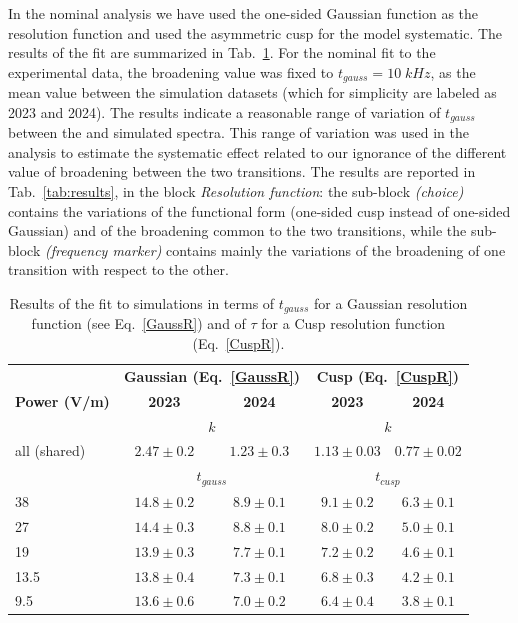 In the nominal analysis we have used the one-sided Gaussian function as the resolution function and used the asymmetric
cusp for the model systematic. The results of the fit are summarized in Tab.~\ref{tab:resfun}. For the nominal fit to the experimental data, the broadening value was fixed to $t_{gauss} = 10 \; kHz$, as the mean value between the simulation datasets (which for simplicity are labeled as 2023 and 2024). The results indicate a reasonable range of variation of $t_{gauss}$ between the \cb and \da simulated spectra. This range of variation was used in the analysis to estimate the systematic effect related to our ignorance of the different value of broadening between the two transitions. The results are reported in Tab.~\ref{tab:results}, in the block \textit{Resolution function}: the sub-block \textit{(choice)} contains the variations of the functional form (one-sided cusp instead of one-sided Gaussian) and of the broadening common to the two transitions, while the sub-block \textit{(frequency marker)} contains mainly the variations of the broadening of one transition with respect to the other.

\begin{table}[!h]
    \centering
    \begin{tabular}{l|cc|cc}
\hline\hline
 & \multicolumn{2}{c|}{\bf Gaussian (Eq.~\ref{GaussR})} & \multicolumn{2}{c}{\bf Cusp (Eq.~\ref{CuspR})} \\ 
{\bf   Power (V/m)}  & {\bf 2023} & {\bf 2024} & {\bf 2023} & {\bf 2024}  \\
 \hline
   & \multicolumn{2}{c|}{$k$} & \multicolumn{2}{c}{$k$} \\ 
all (shared)    &  $2.47 \pm 0.2$ & $1.23 \pm 0.3$ & $1.13 \pm 0.03 $ & $0.77 \pm 0.02 $ \\
\hline  
    & \multicolumn{2}{c|}{$t_{gauss}$} & \multicolumn{2}{c}{$t_{cusp}$} \\ 
38	  & $14.8 \pm 0.2 $ & $8.9 \pm 0.1 $ & $9.1 \pm 0.2 $ & $6.3 \pm 0.1 $ \\
27	  & $14.4 \pm 0.3 $ & $8.8 \pm 0.1 $ & $8.0 \pm 0.2 $ & $5.0 \pm 0.1 $ \\
19	  & $13.9 \pm 0.3 $ & $7.7 \pm 0.1 $ & $7.2 \pm 0.2 $ & $4.6 \pm 0.1 $ \\
13.5  & $13.8 \pm 0.4 $ & $7.3 \pm 0.1 $ & $6.8 \pm 0.3 $ & $4.2 \pm 0.1 $ \\
9.5	  & $13.6 \pm 0.6 $ & $7.0 \pm 0.2 $ & $6.4 \pm 0.4 $ & $3.8 \pm 0.1 $ \\
     \hline \hline
 \end{tabular}
    \caption{Results of the fit to simulations in terms of $t_{gauss}$ for a Gaussian resolution function (see Eq.~\ref{GaussR}) and of $\tau$ for a Cusp resolution function (Eq.~\ref{CuspR}).}
    \label{tab:resfun}
\end{table}

